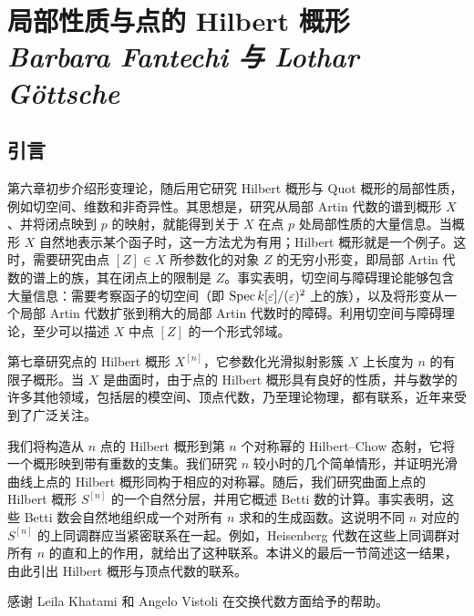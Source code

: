 \part[\parttoc{局部性质与点的 Hilbert 概形}{Barbara Fantechi 与 Lothar Göttsche}]{%
%
局部性质与点的 Hilbert 概形\\[24pt]{\large\normalfont\itshape Barbara Fantechi 与 Lothar Göttsche}}
\chapter*{引言}
第六章初步介绍形变理论，随后用它研究 Hilbert 概形与 Quot 概形的局部性质，例如切空间、维数和非奇异性。其思想是，研究从局部 Artin 代数的谱到概形 $X$、并将闭点映到 $p$ 的映射，就能得到关于 $X$ 在点 $p$ 处局部性质的大量信息。当概形 $X$ 自然地表示某个函子时，这一方法尤为有用；Hilbert 概形就是一个例子。这时，需要研究由点 $[Z]\in X$ 所参数化的对象 $Z$ 的无穷小形变，即局部 Artin 代数的谱上的族，其在闭点上的限制是 $Z$。事实表明，切空间与障碍理论能够包含大量信息：需要考察函子的切空间（即 $\operatorname{Spec} k[\varepsilon]/(\varepsilon)^2$ 上的族），以及将形变从一个局部 Artin 代数扩张到稍大的局部 Artin 代数时的障碍。利用切空间与障碍理论，至少可以描述 $X$ 中点 $[Z]$ 的一个形式邻域。

第七章研究点的 Hilbert 概形 $X^{[n]}$，它参数化光滑拟射影簇 $X$ 上长度为 $n$ 的有限子概形。当 $X$ 是曲面时，由于点的 Hilbert 概形具有良好的性质，并与数学的许多其他领域，包括层的模空间、顶点代数，乃至理论物理，都有联系，近年来受到了广泛关注。

我们将构造从 $n$ 点的 Hilbert 概形到第 $n$ 个对称幂的 Hilbert--Chow 态射，它将一个概形映到带有重数的支集。我们研究 $n$ 较小时的几个简单情形，并证明光滑曲线上点的 Hilbert 概形同构于相应的对称幂。随后，我们研究曲面上点的 Hilbert 概形 $S^{[n]}$ 的一个自然分层，并用它概述 Betti 数的计算。事实表明，这些 Betti 数会自然地组织成一个对所有 $n$ 求和的生成函数。这说明不同 $n$ 对应的 $S^{[n]}$ 的上同调群应当紧密联系在一起。例如，Heisenberg 代数在这些上同调群对所有 $n$ 的直和上的作用，就给出了这种联系。本讲义的最后一节简述这一结果，由此引出 Hilbert 概形与顶点代数的联系。

感谢 Leila Khatami 和 Angelo Vistoli 在交换代数方面给予的帮助。
